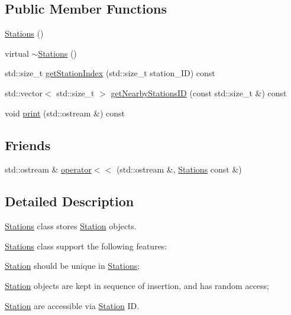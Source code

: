 \subsection*{Public Member Functions}
\begin{DoxyCompactItemize}
\item 
\mbox{\hyperlink{classanen_sta_1_1_stations_aa7c7fcad8a25b1cd14244d5e97c3f4cc}{Stations}} ()
\item 
virtual \mbox{\hyperlink{classanen_sta_1_1_stations_a62d43a2fee0a6b2d9da86717938b383d}{$\sim$\+Stations}} ()
\item 
std\+::size\+\_\+t \mbox{\hyperlink{classanen_sta_1_1_stations_adfe7d2db9b2c39d1a1004c240c9a82dd}{get\+Station\+Index}} (std\+::size\+\_\+t station\+\_\+\+ID) const
\item 
std\+::vector$<$ std\+::size\+\_\+t $>$ \mbox{\hyperlink{classanen_sta_1_1_stations_ac7068f2f170eadf8e62d99f72e253965}{get\+Nearby\+Stations\+ID}} (const std\+::size\+\_\+t \&) const
\item 
void \mbox{\hyperlink{classanen_sta_1_1_stations_ad7e588bc0b3f01ec564109f72b544f12}{print}} (std\+::ostream \&) const
\end{DoxyCompactItemize}
\subsection*{Friends}
\begin{DoxyCompactItemize}
\item 
std\+::ostream \& \mbox{\hyperlink{classanen_sta_1_1_stations_a6c2ba44849c083fa6d206d4573ea523e}{operator$<$$<$}} (std\+::ostream \&, \mbox{\hyperlink{classanen_sta_1_1_stations}{Stations}} const \&)
\end{DoxyCompactItemize}


\subsection{Detailed Description}
\mbox{\hyperlink{classanen_sta_1_1_stations}{Stations}} class stores \mbox{\hyperlink{classanen_sta_1_1_station}{Station}} objects. 

\mbox{\hyperlink{classanen_sta_1_1_stations}{Stations}} class support the following features\+:
\begin{DoxyEnumerate}
\item \mbox{\hyperlink{classanen_sta_1_1_station}{Station}} should be unique in \mbox{\hyperlink{classanen_sta_1_1_stations}{Stations}};
\item \mbox{\hyperlink{classanen_sta_1_1_station}{Station}} objects are kept in sequence of insertion, and has random access;
\item \mbox{\hyperlink{classanen_sta_1_1_station}{Station}} are accessible via \mbox{\hyperlink{classanen_sta_1_1_station}{Station}} ID. 
\end{DoxyEnumerate}


